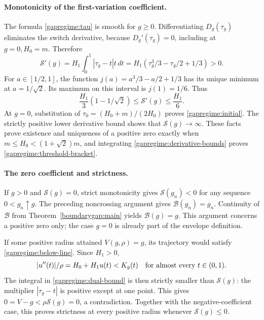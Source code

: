 \paragraph{Monotonicity of the first-variation coefficient.}
The formula \eqref{gapregime:tau} is smooth for $g\ge0$.
Differentiating $D_g(\tau_g)$ eliminates the switch derivative,
because $D_g'(\tau_g)=0$, including at $g=0,H_0=m$.
Therefore
\[
 \mathcal S'(g)=H_1\int_0^1|\tau_g-t|t\,dt
 =H_1(\tau_g^3/3-\tau_g/2+1/3)>0.
\]
For $a\in[1/2,1]$, the function
$j(a)=a^3/3-a/2+1/3$ has its unique minimum at $a=1/\sqrt2$.
Its maximum on this interval is $j(1)=1/6$.  Thus
\begin{equation}\label{gapregime:derivative-bounds}
 \frac{H_1}{3}(1-1/\sqrt2)
       \le\mathcal S'(g)\le\frac{H_1}{6}.
\end{equation}
At $g=0$, substitution of
$\tau_0=(H_0+m)/(2H_0)$ proves
\eqref{gapregime:initial}.  The strictly positive lower derivative
bound shows that $\mathcal S(g)\to\infty$.
These facts prove existence and uniqueness of a positive zero
exactly when $m\le H_0<(1+\sqrt2)m$, and integrating
\eqref{gapregime:derivative-bounds} proves
\eqref{gapregime:threshold-bracket}.

\paragraph{The zero coefficient and strictness.}
If $g>0$ and $\mathcal S(g)=0$, strict monotonicity gives
$\mathcal S(g_n)<0$ for any sequence $0<g_n\uparrow g$.
The preceding noncrossing argument gives
$\mathcal B(g_n)=g_n$.  Continuity of $\mathcal B$ from
Theorem~\ref{boundarygap:main} yields $\mathcal B(g)=g$.
This argument concerns a positive zero only; the case $g=0$ is
already part of the envelope definition.

If some positive radius attained $V(g,\rho)=g$, its trajectory
would satisfy \eqref{gapregime:below-line}.  Since $H_1>0$,
\[
 |u''(t)|/\rho=H_0+H_1u(t)<K_g(t)
 \quad\hbox{for almost every }t\in(0,1).
\]
The integral in \eqref{gapregime:dual-bound} is then strictly
smaller than $\mathcal S(g)$: the multiplier
$|\tau_g-t|$ is positive except at one point.  This gives
$0=V-g<\rho\mathcal S(g)=0$, a contradiction.
Together with the negative-coefficient case, this proves strictness
at every positive radius whenever $\mathcal S(g)\le0$.

